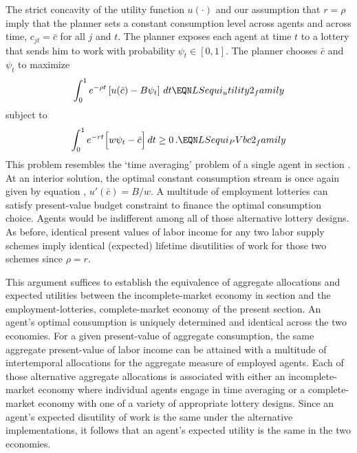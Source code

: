 The strict concavity of the utility function $u(\cdot)$
and our assumption that $r=\rho$ imply that  the planner sets a constant
consumption level across agents and across time,
$c_{jt}=\bar c$ for all $j$ and $t$. The planner exposes each
agent at time $t$ to a lottery that sends him to work with
probability $\psi_t\in [0,1]$. The planner chooses $\bar c$
and $\psi_t$ to maximize
$$
\int_0^1 e^{-\rho t} \left[u(\bar c) - B \psi_t \right]\,dt
\EQN LSequi_utility2_family
$$
subject to
$$
\int_0^1 e^{-r t} \Bigl[w \psi_t - \bar c \Bigr]\,dt \geq 0\,.
\EQN LSequi_PVbc2_family
$$
This problem resembles the `time averaging' problem of a
single agent in section . At an
interior solution, the optimal
constant consumption stream is once again given by
equation , $u'(\bar c)=B/w$.
A multitude of employment
lotteries  can satisfy present-value budget constraint
 to finance the optimal consumption
choice. Agents would be
indifferent among  all of those alternative lottery designs.
As before, identical present values of labor income for any
two labor supply schemes imply identical (expected)
lifetime disutilities of work for those two schemes since
$\rho = r$.

This argument suffices to  establish the  equivalence of
aggregate allocations and expected utilities between the
incomplete-market economy in section 
and the employment-lotteries, complete-market economy of the present section.
An agent's optimal consumption is uniquely determined
and identical across  the two economies. For a given
present-value of aggregate consumption, the same
aggregate present-value of labor income can be attained with
a multitude of intertemporal allocations for the aggregate
measure of employed agents. Each of those
alternative aggregate allocations is associated with
either an incomplete-market economy where individual agents
engage in time averaging or a complete-market economy with one of a variety of appropriate
 lottery designs. Since an
agent's expected disutility of work is the same under the
alternative implementations, it follows
that an agent's expected utility is the same in the two
economies.



